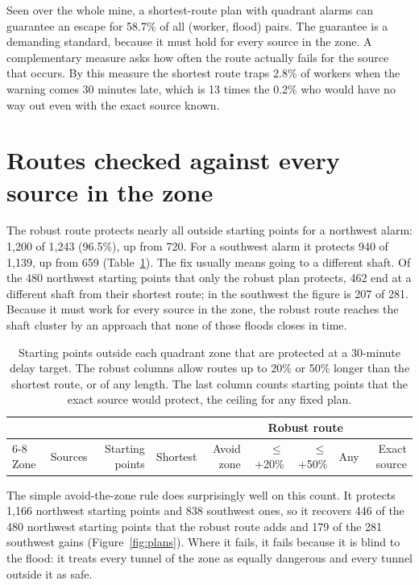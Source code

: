 \documentclass[11pt,a4paper]{article}
\begin{document}
Seen over the whole mine, a shortest-route plan with quadrant alarms can guarantee an escape for 58.7\% of all (worker, flood) pairs. The guarantee is a demanding standard, because it must hold for every source in the zone. A complementary measure asks how often the route actually fails for the source that occurs. By this measure the shortest route traps 2.8\% of workers when the warning comes 30 minutes late, which is 13 times the 0.2\% who would have no way out even with the exact source known.

\section{Routes checked against every source in the zone}\label{sec:fix}
The robust route protects nearly all outside starting points for a northwest alarm: 1,200 of 1,243 (96.5\%), up from 720. For a southwest alarm it protects 940 of 1,139, up from 659 (Table~\ref{tab:plans}). The fix usually means going to a different shaft. Of the 480 northwest starting points that only the robust plan protects, 462 end at a different shaft from their shortest route; in the southwest the figure is 207 of 281. Because it must work for every source in the zone, the robust route reaches the shaft cluster by an approach that none of those floods closes in time.

\begin{table}[htbp]
\centering\small
\caption{Starting points outside each quadrant zone that are protected at a 30-minute delay target. The robust columns allow routes up to 20\% or 50\% longer than the shortest route, or of any length. The last column counts starting points that the exact source would protect, the ceiling for any fixed plan.}\label{tab:plans}
\begin{tabular}{@{}lrrrrrrrr@{}}\toprule
& & & & & \multicolumn{3}{c}{Robust route} & \\
\cmidrule(lr){6-8}
Zone & Sources & Starting points & Shortest & Avoid zone & $\le$+20\% & $\le$+50\% & Any & Exact source\\\midrule

\end{tabular}
\end{table}

The simple avoid-the-zone rule does surprisingly well on this count. It protects 1,166 northwest starting points and 838 southwest ones, so it recovers 446 of the 480 northwest starting points that the robust route adds and 179 of the 281 southwest gains (Figure~\ref{fig:plans}). Where it fails, it fails because it is blind to the flood: it treats every tunnel of the zone as equally dangerous and every tunnel outside it as safe.
\end{document}
